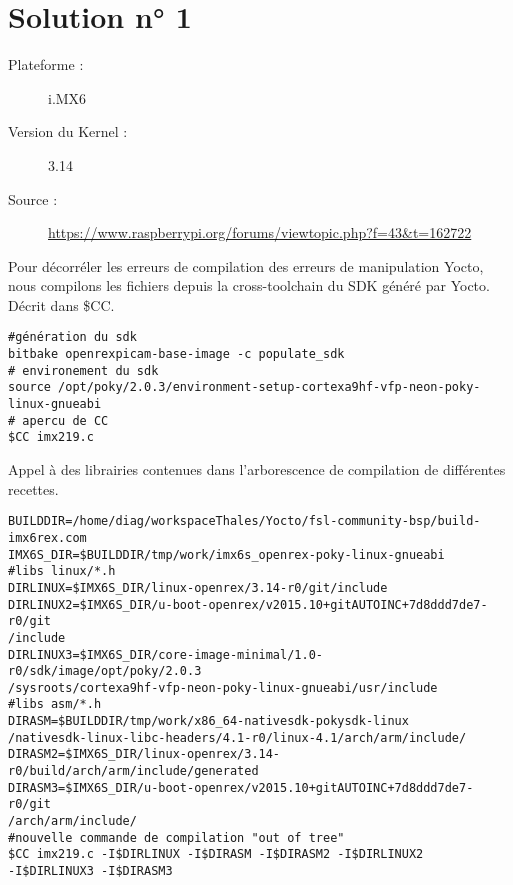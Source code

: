 \chapter{Solution n° 1} %
\label{Chapter2} %

\begin{description}
  \item[Plateforme :] i.MX6
  \item[Version du Kernel :] 3.14
  \item[Source :] \href{https://www.raspberrypi.org/forums/viewtopic.php?f=43&t=162722}
  {https://www.raspberrypi.org/forums/viewtopic.php?f=43\&t=162722}
\end{description}

Pour décorréler les erreurs de compilation des erreurs de manipulation Yocto,
nous  compilons les fichiers depuis la cross-toolchain du SDK généré par Yocto.
Décrit dans \$CC.

\begin{lstlisting}
#génération du sdk
bitbake openrexpicam-base-image -c populate_sdk
# environement du sdk
source /opt/poky/2.0.3/environment-setup-cortexa9hf-vfp-neon-poky-linux-gnueabi
# apercu de CC
$CC imx219.c
\end{lstlisting}

Appel à des librairies contenues dans l’arborescence de compilation de
différentes recettes.

\begin{lstlisting}
BUILDDIR=/home/diag/workspaceThales/Yocto/fsl-community-bsp/build-imx6rex.com
IMX6S_DIR=$BUILDDIR/tmp/work/imx6s_openrex-poky-linux-gnueabi
#libs linux/*.h
DIRLINUX=$IMX6S_DIR/linux-openrex/3.14-r0/git/include
DIRLINUX2=$IMX6S_DIR/u-boot-openrex/v2015.10+gitAUTOINC+7d8ddd7de7-r0/git
/include
DIRLINUX3=$IMX6S_DIR/core-image-minimal/1.0-r0/sdk/image/opt/poky/2.0.3
/sysroots/cortexa9hf-vfp-neon-poky-linux-gnueabi/usr/include
#libs asm/*.h
DIRASM=$BUILDDIR/tmp/work/x86_64-nativesdk-pokysdk-linux
/nativesdk-linux-libc-headers/4.1-r0/linux-4.1/arch/arm/include/
DIRASM2=$IMX6S_DIR/linux-openrex/3.14-r0/build/arch/arm/include/generated
DIRASM3=$IMX6S_DIR/u-boot-openrex/v2015.10+gitAUTOINC+7d8ddd7de7-r0/git
/arch/arm/include/
#nouvelle commande de compilation "out of tree"
$CC imx219.c -I$DIRLINUX -I$DIRASM -I$DIRASM2 -I$DIRLINUX2
-I$DIRLINUX3 -I$DIRASM3
\end{lstlisting}

